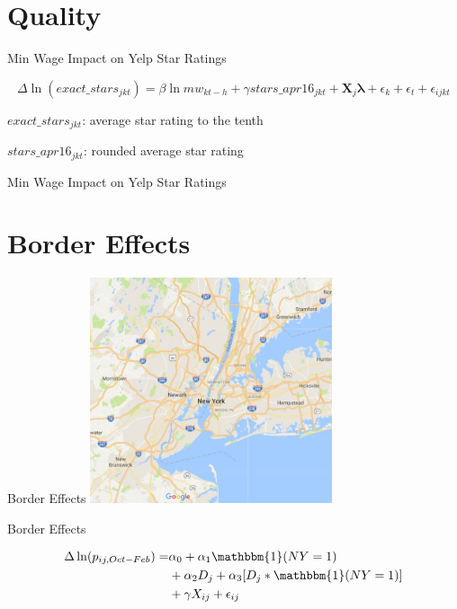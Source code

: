 \documentclass[xcolor=table]{beamer}
\begin{document}
\begin{spacing}{1.2}
\section{Quality}






\begin{frame}{Min Wage Impact on Yelp Star Ratings}

\begin{dmath}
\Delta \ln(exact\_stars_{jkt}) =\beta \ln mw_{kt-h}  +    \gamma stars\_apr16_{jkt} +\boldsymbol{X}_j  \boldsymbol{\lambda} + \epsilon_k + \epsilon_t + \epsilon_{ijkt}
\end{dmath}

$exact\_stars_{jkt}$: average star rating to the tenth

$stars\_apr16_{jkt}$: rounded average star rating


\end{frame}


\begin{frame}{Min Wage Impact on Yelp Star Ratings}
\centering
\scriptsize

\end{frame}



\section{Border Effects}

\begin{frame}{Border Effects}
\centering
\includegraphics[width=2.8in]{nynj_map_google.jpg}

\end{frame}

\begin{frame}{Border Effects}

$$
\begin{aligned}
\Delta \ln (p_{ij,Oct-Feb})  = & \alpha_0 + \alpha_1  \mathbbm{1}(NY=1)  \\
& + \alpha_2 D_{j} + \alpha_3[D_j * \mathbbm{1}(NY=1)]  \\
& +\gamma X_{ij}  + \epsilon_{ij} 
\end{aligned}
$$


\end{frame}
\end{spacing}
\end{document}
